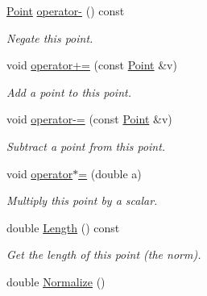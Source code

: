 \begin{DoxyCompactItemize}
\hyperlink{structp2t_1_1Point}{Point} \hyperlink{structp2t_1_1Point_a0d5817d4ea8de01e587e4c1d54925046}{operator-\/} () const
\begin{DoxyCompactList}\small\item\em Negate this point. \end{DoxyCompactList}\item 
\mbox{\label{structp2t_1_1Point_a114de25986403a4096c16332d388372d}} 
void \hyperlink{structp2t_1_1Point_a114de25986403a4096c16332d388372d}{operator+=} (const \hyperlink{structp2t_1_1Point}{Point} \&v)
\begin{DoxyCompactList}\small\item\em Add a point to this point. \end{DoxyCompactList}\item 
\mbox{\label{structp2t_1_1Point_a7d22374466d39be1624a895648d1f980}} 
void \hyperlink{structp2t_1_1Point_a7d22374466d39be1624a895648d1f980}{operator-\/=} (const \hyperlink{structp2t_1_1Point}{Point} \&v)
\begin{DoxyCompactList}\small\item\em Subtract a point from this point. \end{DoxyCompactList}\item 
\mbox{\label{structp2t_1_1Point_a833e141215999f1b467fbf2915240ed7}} 
void \hyperlink{structp2t_1_1Point_a833e141215999f1b467fbf2915240ed7}{operator$\ast$=} (double a)
\begin{DoxyCompactList}\small\item\em Multiply this point by a scalar. \end{DoxyCompactList}\item 
\mbox{\label{structp2t_1_1Point_a03e8d1c1296721f56c4dee2e61d45744}} 
double \hyperlink{structp2t_1_1Point_a03e8d1c1296721f56c4dee2e61d45744}{Length} () const
\begin{DoxyCompactList}\small\item\em Get the length of this point (the norm). \end{DoxyCompactList}\item 
\mbox{\label{structp2t_1_1Point_ad8add2f6f3c4a220bc5741510701f9f7}} 
double \hyperlink{structp2t_1_1Point_ad8add2f6f3c4a220bc5741510701f9f7}{Normalize} ()

\end{DoxyCompactItemize}

